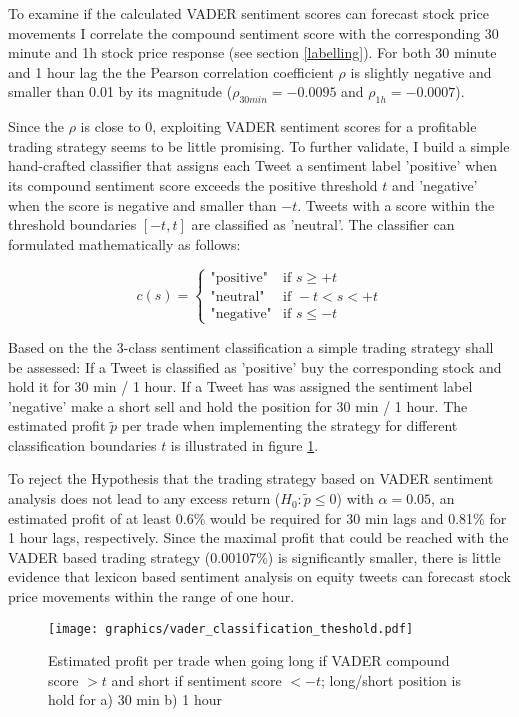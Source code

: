 \documentclass[a4paper,12pt]{article}%
\begin{document}
To examine if the calculated VADER sentiment scores can forecast stock price movements I correlate the compound sentiment score with the corresponding 30 minute and 1h stock price response (see section \ref{labelling}). For both 30 minute and 1 hour lag the the Pearson correlation coefficient $\rho$ is slightly negative and smaller than 0.01 by its magnitude ($\rho_{30min}=-0.0095$ and $\rho_{1h}=-0.0007$).

Since the $\rho$ is close to 0, exploiting VADER sentiment scores for a profitable trading strategy seems to be little promising. To further validate, I build a simple hand-crafted classifier that assigns each Tweet a sentiment label 'positive' when its compound sentiment score exceeds the positive threshold $t$ and 'negative' when the score is negative and smaller than $-t$. Tweets with a score within the threshold boundaries $[-t,t]$ are classified as 'neutral'. The classifier can formulated mathematically as follows:

$$ 
 c(s) =
   \begin{cases}
     \text{"positive"} & \text{if } s \geq +t\\
     \text{"neutral"}  & \text{if } -t < s < +t \\
     \text{"negative"}  & \text{if } s \leq -t
   \end{cases}
$$

Based on the the 3-class sentiment classification a simple trading strategy shall be assessed: If a Tweet is classified as 'positive' buy the corresponding stock and hold it for 30 min / 1 hour. If a Tweet has was assigned the sentiment label 'negative' make a short sell and hold the position for 30 min / 1 hour. The estimated profit $\tilde{p}$ per trade when implementing the strategy for different classification boundaries $t$ is illustrated in figure \ref{fig:vader_class_threshold}. 

To reject the Hypothesis that the trading strategy based on VADER sentiment analysis does not lead to any excess return ($H_0: \tilde{p} \leq 0$) with $\alpha = 0.05$, an estimated profit of at least 0.6\% would be required for 30 min lags and 0.81\% for 1 hour lags, respectively. Since the maximal profit that could be reached with the  VADER based trading strategy (0.00107\%) is significantly smaller, there is little evidence that lexicon based sentiment analysis on equity tweets can forecast stock price movements within the range of one hour.


\begin{figure}
\captionsetup{justification=centering}
\centering
\texttt{[image: graphics/vader\_classification\_theshold.pdf]}
\caption{Estimated profit per trade when going long if VADER compound score $>t$ and short if sentiment score $< -t$; long/short position is hold for a) 30 min b) 1 hour \label{fig:vader_class_threshold}}
\end{figure}
\end{document}
